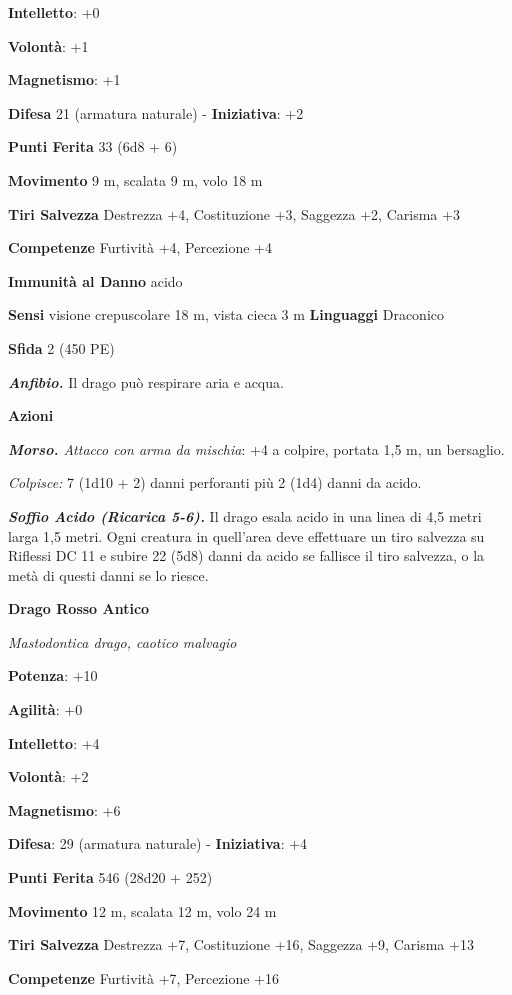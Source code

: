 \begin{multicols}{2}
\textbf{Intelletto}: +0

\textbf{Volontà}: +1

\textbf{Magnetismo}: +1

\textbf{Difesa} 21 (armatura naturale) - \textbf{Iniziativa}: +2

\textbf{Punti Ferita} 33 (6d8 + 6)

\textbf{Movimento} 9 m, scalata 9 m, volo 18 m

\textbf{Tiri Salvezza} Destrezza +4, Costituzione +3, Saggezza +2,
Carisma +3

\textbf{Competenze} Furtività +4, Percezione +4

\textbf{Immunità al Danno} acido

\textbf{Sensi} visione crepuscolare 18 m, vista cieca 3 m
\textbf{Linguaggi} Draconico

\textbf{Sfida} 2 (450 PE)

\emph{\textbf{Anfibio.}} Il drago può respirare aria e acqua.

\textbf{Azioni}

\emph{\textbf{Morso.} Attacco con arma da mischia}: +4 a colpire,
portata 1,5 m, un bersaglio.

\emph{Colpisce:} 7 (1d10 + 2) danni perforanti più 2 (1d4) danni da
acido.

\emph{\textbf{Soffio Acido (Ricarica 5-6).}} Il drago esala acido in una
linea di 4,5 metri larga 1,5 metri. Ogni creatura in quell'area deve
effettuare un tiro salvezza su Riflessi DC 11 e subire 22 (5d8) danni
da acido se fallisce il tiro salvezza, o la metà di questi danni se lo
riesce.

\textbf{Drago Rosso Antico}

\emph{Mastodontica drago, caotico malvagio}

\textbf{Potenza}: +10

\textbf{Agilità}: +0

\textbf{Intelletto}: +4

\textbf{Volontà}: +2

\textbf{Magnetismo}: +6

\textbf{Difesa}: 29 (armatura naturale) - \textbf{Iniziativa}: +4

\textbf{Punti Ferita} 546 (28d20 + 252)

\textbf{Movimento} 12 m, scalata 12 m, volo 24 m

\textbf{Tiri Salvezza} Destrezza +7, Costituzione +16, Saggezza +9,
Carisma +13

\textbf{Competenze} Furtività +7, Percezione +16


\end{multicols}
